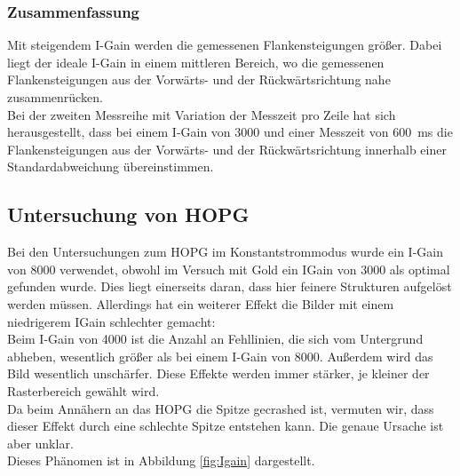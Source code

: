 \documentclass[12pt,a4paper]{article}
\begin{document}
\subsubsection{Zusammenfassung}
Mit steigendem I-Gain werden die gemessenen Flankensteigungen größer. Dabei liegt der ideale I-Gain in einem mittleren Bereich, wo die gemessenen Flankensteigungen aus der Vorwärts- und der Rückwärtsrichtung nahe zusammenrücken. \\
Bei der zweiten Messreihe mit Variation der Messzeit pro Zeile hat sich herausgestellt, dass bei einem I-Gain von 3000 und einer Messzeit von \SI{600}{ms} die Flankensteigungen aus der Vorwärts- und der Rückwärtsrichtung innerhalb einer Standardabweichung übereinstimmen.
\newpage
\subsection{Untersuchung von HOPG}
Bei den Untersuchungen zum HOPG im Konstantstrommodus wurde ein I-Gain von 8000 verwendet, obwohl im Versuch mit Gold ein IGain von 3000 als optimal gefunden wurde. Dies liegt einerseits daran, dass hier feinere Strukturen aufgelöst werden müssen. Allerdings hat ein weiterer Effekt die Bilder mit einem niedrigerem IGain schlechter gemacht:\\
Beim I-Gain von 4000 ist die Anzahl an Fehllinien, die sich vom Untergrund abheben, wesentlich größer als bei einem I-Gain von 8000. Außerdem wird das Bild wesentlich unschärfer. Diese Effekte werden immer stärker, je kleiner der Rasterbereich gewählt wird.\\
Da beim Annähern an das HOPG die Spitze gecrashed ist, vermuten wir, dass dieser Effekt durch eine schlechte Spitze entstehen kann. Die genaue Ursache ist aber unklar.\\
Dieses Phänomen ist in Abbildung \ref{fig:Igain} dargestellt.
\end{document}
